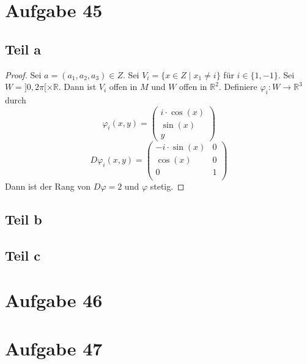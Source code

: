 \documentclass[10pt,a4paper]{article}
\begin{document}
\section{Aufgabe 45}

\subsection{Teil a}

\begin{proof}
  Sei $a = (a_{1}, a_{2}, a_{3}) \in Z$.
  Sei $V_{i} = \{ x \in Z \mid x_{1} \ne i \}$ für $i \in \{ 1, -1 \}$.
  Sei $W = ]0, 2\pi[ \times \mathbb{R}$.
  Dann ist $V_{i}$ offen in $M$ und $W$ offen in $\mathbb{R}^{2}$.
  Definiere $\varphi_{i} : W \rightarrow \mathbb{R}^{3}$ durch
  \begin{equation}
    \varphi_{i}(x, y) = \begin{pmatrix}
      i \cdot \cos(x)\\
      \sin(x)\\
      y
    \end{pmatrix}
  \end{equation}
  \begin{equation}
    D\varphi_{i}(x, y) = \begin{pmatrix}
      -i \cdot \sin(x) & 0\\
      \cos(x) & 0\\
      0 & 1\\
    \end{pmatrix}
  \end{equation}
  Dann ist der Rang von $D\varphi = 2$ und $\varphi$ stetig.

\end{proof}

\subsection{Teil b}

\subsection{Teil c}

\section{Aufgabe 46}

\section{Aufgabe 47}
\end{document}
